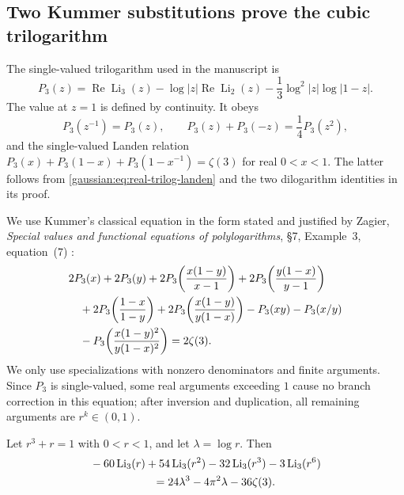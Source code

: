 \subsection{Two Kummer substitutions prove the cubic trilogarithm}

The single-valued trilogarithm used in the manuscript is
\[
P_3(z)=\operatorname{Re}\operatorname{Li}_3(z)
 -\log|z|\operatorname{Re}\operatorname{Li}_2(z)
 -\frac13\log^2|z|\log|1-z|.
\]
The value at $z=1$ is defined by continuity. It obeys
\[
P_3(z^{-1})=P_3(z),\qquad
P_3(z)+P_3(-z)=\frac14P_3(z^2),
\]
and the single-valued Landen relation
$P_3(x)+P_3(1-x)+P_3(1-x^{-1})=\zeta(3)$ for real $0<x<1$.
The latter follows from \eqref{gaussian:eq:real-trilog-landen} and the two
dilogarithm identities in its proof.

We use Kummer's classical equation in the form stated and justified
by Zagier, \emph{Special values and functional equations of
polylogarithms}, \S7, Example~3, equation~(7) \cite{gaussian:Zagier}:
\begin{align}
&2P_3(x)+2P_3(y)
 +2P_3\!\left(\frac{x(1-y)}{x-1}\right)
 +2P_3\!\left(\frac{y(1-x)}{y-1}\right)\notag\\
&\quad+2P_3\!\left(\frac{1-x}{1-y}\right)
 +2P_3\!\left(\frac{x(1-y)}{y(1-x)}\right)
 -P_3(xy)-P_3(x/y)\notag\\
&\quad-P_3\!\left(\frac{x(1-y)^2}{y(1-x)^2}\right)=2\zeta(3).
\label{gaussian:eq:kummer-P3}
\end{align}
We only use specializations with nonzero denominators and finite
arguments. Since $P_3$ is single-valued, some real arguments exceeding
$1$ cause no branch correction in this equation; after inversion and
duplication, all remaining arguments are $r^k\in(0,1)$.

\begin{theorem}
\label{gaussian:thm:cubic-proved}
Let $r^3+r=1$ with $0<r<1$, and let $\lambda=\log r$. Then
\begin{align}
&-60\operatorname{Li}_3(r)+54\operatorname{Li}_3(r^2)
 -32\operatorname{Li}_3(r^3)-3\operatorname{Li}_3(r^6)\notag\\
&\hspace{20mm}=24\lambda^3-4\pi^2\lambda-36\zeta(3).
\label{gaussian:eq:cubic-proved}
\end{align}
\end{theorem}

